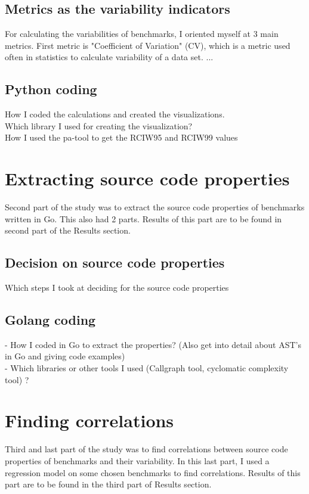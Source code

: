 \documentclass{seal_thesis}
\begin{document}
\subsection{Metrics as the variability indicators}
For calculating the variabilities of benchmarks, I oriented myself at 3 main metrics. First metric is "Coefficient of Variation" (CV), which is a metric used often in statistics to calculate variability of a data set. ...

\subsection{Python coding}
How I coded the calculations and created the visualizations. \\
Which library I used for creating the visualization? \\
How I used the pa-tool to get the RCIW95 and RCIW99 values \\

\section{Extracting source code properties}
Second part of the study was to extract the source code properties of benchmarks written in Go. This also had 2 parts. Results of this part are to be found in second part of the Results section.

\subsection{Decision on source code properties}
Which steps I took at deciding for the source code properties

\subsection{Golang coding}
- How I coded in Go to extract the properties? (Also get into detail about AST's in Go and giving code examples) \\
- Which libraries or other tools I used (Callgraph tool, cyclomatic complexity tool) ? \\

\section{Finding correlations}
Third and last part of the study was to find correlations between source code properties of benchmarks and their variability. In this last part, I used a regression model on some chosen benchmarks to find correlations. Results of this part are to be found in the third part of Results section.
\end{document}

